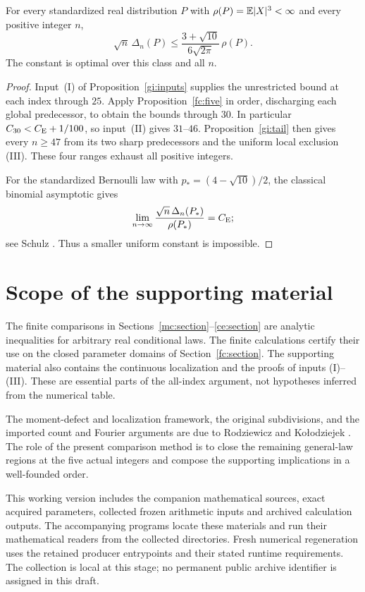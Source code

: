 \begin{theorem}\label{fc:main}
For every standardized real distribution $P$ with
$\rho(P)=\mathbb E|X|^3<\infty$ and every positive integer $n$,
\[
 \sqrt n\,\Delta_n(P)\le
 \frac{3+\sqrt{10}}{6\sqrt{2\pi}}\,\rho(P).
\]
The constant is optimal over this class and all $n$.
\end{theorem}
\begin{proof}
Input~(I) of Proposition~\ref{gi:inputs} supplies the unrestricted
bound at each index through $25$. Apply Proposition~\ref{fc:five}
in order, discharging each global predecessor, to obtain the
bounds through $30$. In particular $C_{30}<C_{\mathrm E}+1/100$, so
input~(II) gives $31$--$46$. Proposition~\ref{gi:tail} then gives
every $n\ge47$ from its two sharp predecessors and the uniform
local exclusion (III).
These four ranges exhaust all positive integers.

For the standardized Bernoulli law with
$p_*=(4-\sqrt{10})/2$, the classical binomial asymptotic gives
\[
 \lim_{n\to\infty}\frac{\sqrt n\,\Delta_n(P_*)}{\rho(P_*)}=C_{\mathrm E};
\]
see Schulz \cite[Remarks~4.1 and 4.2]{Schulz2016}.
Thus a smaller uniform constant is impossible.
\end{proof}

\section{Scope of the supporting material}\label{fc:supporting}
The finite comparisons in Sections~\ref{mc:section}--\ref{ce:section}
are analytic inequalities for arbitrary real conditional laws.
The finite calculations certify their use on the closed parameter
domains of Section~\ref{fc:section}. The supporting material also
contains the continuous localization and the proofs of inputs
(I)--(III). These are essential parts of the all-index argument,
not hypotheses inferred from the numerical table.

The moment-defect and localization framework, the original
subdivisions, and the imported count and Fourier arguments are
due to Rodziewicz and Ko\l{}odziejek \cite{RK2026}.
The role of the present comparison method is to close the remaining
general-law regions at the five actual integers and compose the
supporting implications in a well-founded order.

This working version includes the companion mathematical sources,
exact acquired parameters, collected frozen arithmetic inputs and
archived calculation outputs. The accompanying programs locate these
materials and run their mathematical readers from the collected
directories. Fresh numerical regeneration uses the retained producer
entrypoints and their stated runtime requirements. The collection is
local at this stage; no permanent public archive identifier is assigned
in this draft.
